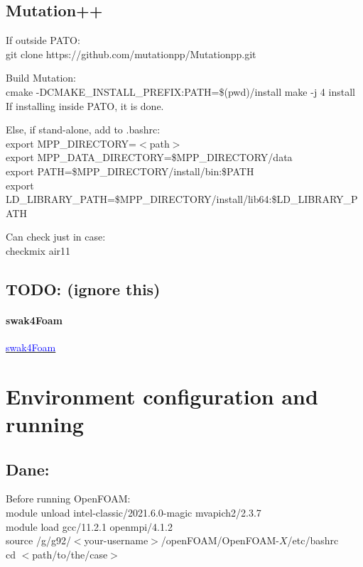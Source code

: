 \documentclass[a4paper, 12pt]{article}
\numberwithin{equation}{section}
\newcommand{\code}{\fontfamily{pcr}\selectfont}
\newcommand{\blue}[1]{\textcolor{blue}{#1}}
\begin{document}
    \subsection{Mutation++ \\}
    \label{sec:mutation}

        If outside PATO: \\
        git clone https://github.com/mutationpp/Mutationpp.git

        Build Mutation: \\
        cmake -DCMAKE\_INSTALL\_PREFIX:PATH=\$(pwd)/install
        make -j 4 install \\

        If installing inside PATO, it is done.

        Else, if stand-alone, add to .bashrc: \\
        export MPP\_DIRECTORY=$<$path$>$ \\
        export MPP\_DATA\_DIRECTORY=\$MPP\_DIRECTORY/data \\
        export PATH=\$MPP\_DIRECTORY/install/bin:\$PATH \\
        export LD\_LIBRARY\_PATH=\$MPP\_DIRECTORY/install/lib64:\$LD\_LIBRARY\_PATH

        Can check just in case: \\
        checkmix air11

    \subsection{TODO: (ignore this)}
    \paragraph{swak4Foam \\}

        \href{https://www.cfd-online.com/Forums/openfoam-community-contributions/222909-swak4foam-installation-openfoam-7-a.html}{\blue{swak4Foam}}

\section{Environment configuration and running}

    \subsection{Dane:}
        Before running OpenFOAM: \\
        {\code module unload intel-classic/2021.6.0-magic mvapich2/2.3.7} \\
        {\code module load gcc/11.2.1 openmpi/4.1.2} \\
        {\code source /g/g92/$<$your-username$>$/openFOAM/OpenFOAM-$X$/etc/bashrc} \\
        {\code cd $<$path/to/the/case$>$}
\end{document}
